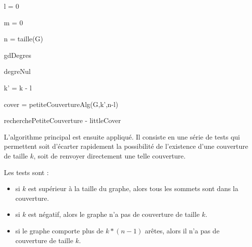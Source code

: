 \documentclass[a4paper,10pt]{article}
\begin{document}
\vspace{0.35cm}
\begin{algorithm}[H]

\BlankLine

l = 0 

m = 0 

n = taille(G)

gdDegres 

degreNul 


k' = k - l


cover = petiteCouvertureAlg(G,k',n-l)



\caption{recherchePetiteCouverture - littleCover}
\end{algorithm}

L'algorithme principal est ensuite appliqué. Il consiste en une série de tests qui permettent soit d'écarter rapidement la possibilité de l'existence d'une couverture de taille $k$, soit de renvoyer directement une telle couverture. 

Les tests sont : 
\begin{itemize}
\item si $k$ est supérieur à la taille du graphe, alors tous les sommets sont dans la couverture.
\item si $k$ est négatif, alors le graphe n'a pas de couverture de taille $k$.
\item si le graphe comporte plus de $k*(n-1)$ arêtes, alors il n'a pas de couverture de taille $k$.
\end{itemize}
\end{document}
